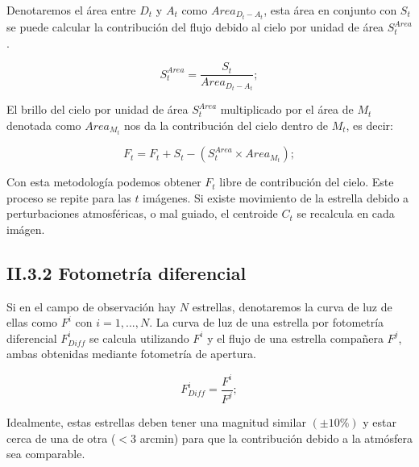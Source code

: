 Denotaremos el área entre $D_{t}$ y $A_{t}$ como $Area_{D_{t}-A_{t}}$, esta área en conjunto con $S_{t}$ se puede calcular la contribución del flujo debido al cielo por unidad de área $S^{Area}_{t}$.

\begin{equation}
  \displaystyle S^{Area}_{t} = \dfrac{S_{t}}{Area_{D_{t}-A_{t}}};
\end{equation}

El brillo del cielo por unidad de área $S^{Area}_{t}$ multiplicado por el área de $M_{t}$ denotada como $Area_{M_{t}}$	nos da la contribución del cielo dentro de $M_{t}$, es decir:

\begin{equation}
  \displaystyle F_{t} = F_{t} + S_{t} - \left( S^{Area}_{t}\times Area_{M_{t}}\right);
\end{equation}

Con esta metodología podemos obtener $F_{t}$ libre de contribución del cielo. Este proceso se repite para las $t$ imágenes. Si existe movimiento de la estrella debido a perturbaciones atmosféricas, o mal guiado, el centroide $ C_{t} $ se recalcula en cada imágen.


\subsection*{II.3.2 Fotometría diferencial}

Si en el campo de observación hay $ N $ estrellas, denotaremos la curva de luz de ellas como $F^{i}$ con $i=1,...,N$. La curva de luz de una estrella por fotometría diferencial $F^{i}_{Diff}$ se calcula utilizando $F^{i}$ y el flujo de una estrella compañera $F^{j}$, ambas obtenidas mediante fotometría de apertura. 


\begin{equation}
  \displaystyle F^{i}_{Diff}=\dfrac{F^{i}}{F^{j}};
\end{equation}

Idealmente, estas estrellas deben tener una magnitud similar $(\pm 10 \%)$ y estar cerca de una de otra ($<3$ arcmin) para que la contribución debido a la atmósfera sea comparable.


